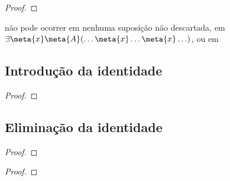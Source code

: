 \begin{multicols}{2}
\begin{proof}
	\open	
	\close
\end{proof}

\medskip\begin{raggedright}
\noindent {} não pode ocorrer em nenhuma suposição não descartada, em $\exists \meta{x}\meta{A}(\ldots \meta{x} \ldots \meta{x}\ldots)$, ou em \end{raggedright}\vfill\columnbreak

\end{multicols}

\subsection*{Introdução da identidade}

\begin{proof}
	 
\end{proof}


\subsection*{Eliminação da identidade}

\begin{multicols}{2}
\begin{proof}
	 
\end{proof}
\begin{proof}
	 
\end{proof}
\end{multicols}

